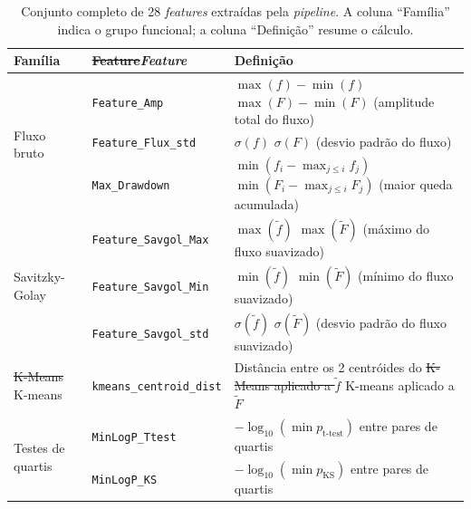 \documentclass[msc]{on} %
\makeatletter
\providecommand{\DIFaddtex}[1]{{\protect\color{red}#1}} %
\providecommand{\DIFdeltex}[1]{{\protect\color{red}\sout{#1}}} %
\providecommand{\DIFaddFL}[1]{\DIFadd{#1}} %
\providecommand{\DIFdelFL}[1]{\DIFdel{#1}} %
\providecommand{\DIFaddbeginFL}{} %
\providecommand{\DIFaddendFL}{} %
\providecommand{\DIFdelbeginFL}{} %
\providecommand{\DIFdelendFL}{} %
\providecommand{\DIFadd}[1]{\texorpdfstring{\DIFaddtex{#1}}{#1}} %
\providecommand{\DIFdel}[1]{\texorpdfstring{\DIFdeltex{#1}}{}} %
\let\sout@orig\sout %
\renewcommand{\sout}[1]{\ifmmode\text{\sout@orig{\ensuremath{#1}}}\else\sout@orig{#1}\fi} %
\makeatother
\begin{document}
\begin{table}[htbp]
\centering
\caption{Conjunto completo de 28 \textit{features} extraídas pela \textit{pipeline}. A coluna ``Família'' indica o grupo funcional; a coluna ``Definição'' resume o cálculo.}
\label{tab:features_completo}
\footnotesize
\begin{tabular}{llp{7.5cm}}
\hline
\textbf{Família} & \textbf{\DIFdelbeginFL \DIFdelFL{Feature}\DIFdelendFL \DIFaddbeginFL \textit{\DIFaddFL{Feature}}\DIFaddendFL } & \textbf{Definição} \\
\hline
\multirow{3}{*}{Fluxo bruto}
& \texttt{Feature\_Amp} & \DIFdelbeginFL \DIFdelFL{$\max(f) - \min(f)$ }\DIFdelendFL \DIFaddbeginFL \DIFaddFL{$\max(F) - \min(F)$ }\DIFaddendFL (amplitude total do fluxo) \\
& \texttt{Feature\_Flux\_std} & \DIFdelbeginFL \DIFdelFL{$\sigma(f)$ }\DIFdelendFL \DIFaddbeginFL \DIFaddFL{$\sigma(F)$ }\DIFaddendFL (desvio padrão do fluxo) \\
& \texttt{Max\_Drawdown} & \DIFdelbeginFL \DIFdelFL{$\min(f_i - \max_{j \le i} f_j)$ }\DIFdelendFL \DIFaddbeginFL \DIFaddFL{$\min(F_i - \max_{j \le i} F_j)$ }\DIFaddendFL (maior queda acumulada) \\
\hline
\multirow{3}{*}{Savitzky-Golay}
& \texttt{Feature\_Savgol\_Max} & \DIFdelbeginFL \DIFdelFL{$\max(\tilde{f})$ }\DIFdelendFL \DIFaddbeginFL \DIFaddFL{$\max(\tilde{F})$ }\DIFaddendFL (máximo do fluxo suavizado) \\
& \texttt{Feature\_Savgol\_Min} & \DIFdelbeginFL \DIFdelFL{$\min(\tilde{f})$ }\DIFdelendFL \DIFaddbeginFL \DIFaddFL{$\min(\tilde{F})$ }\DIFaddendFL (mínimo do fluxo suavizado) \\
& \texttt{Feature\_Savgol\_std} & \DIFdelbeginFL \DIFdelFL{$\sigma(\tilde{f})$ }\DIFdelendFL \DIFaddbeginFL \DIFaddFL{$\sigma(\tilde{F})$ }\DIFaddendFL (desvio padrão do fluxo suavizado) \\
\hline
\DIFdelbeginFL \DIFdelFL{K-Means }\DIFdelendFL \DIFaddbeginFL \DIFaddFL{K-means }\DIFaddendFL & \texttt{kmeans\_centroid\_dist} & Distância entre os 2 centróides do \DIFdelbeginFL \DIFdelFL{K-Means aplicado a $\tilde{f}$ }\DIFdelendFL \DIFaddbeginFL \DIFaddFL{K-means aplicado a $\tilde{F}$ }\DIFaddendFL \\
\hline
\multirow{2}{*}{Testes de quartis}
& \texttt{MinLogP\_Ttest} & $-\log_{10}(\min p_{\text{t-test}})$ entre pares de quartis \\
& \texttt{MinLogP\_KS} & $-\log_{10}(\min p_{\text{KS}})$ entre pares de quartis \\

\end{tabular}
\end{table}
\end{document}
